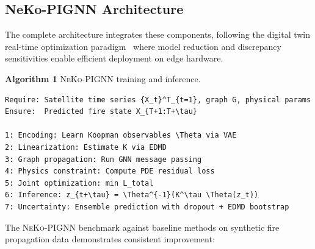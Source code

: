 \documentclass[5p,twocolumn]{elsarticle}
\newcommand{\abbrev}[1]{{\small\textsc{#1}}}
\begin{document}
\subsection{NeKo-PIGNN Architecture}

The complete architecture integrates these components, following the digital twin real-time optimization paradigm~\cite{hart2025} where model reduction and discrepancy sensitivities enable efficient deployment on edge hardware.

\medskip
\noindent\textbf{Algorithm 1} \abbrev{NeKo-PIGNN} training and inference.
\label{alg:neko}
\small
\begin{verbatim}
Require: Satellite time series {X_t}^T_{t=1}, graph G, physical params
Ensure:  Predicted fire state X_{T+1:T+\tau}

1: Encoding: Learn Koopman observables \Theta via VAE
2: Linearization: Estimate K via EDMD
3: Graph propagation: Run GNN message passing
4: Physics constraint: Compute PDE residual loss
5: Joint optimization: min L_total
6: Inference: z_{t+\tau} = \Theta^{-1}(K^\tau \Theta(z_t))
7: Uncertainty: Ensemble prediction with dropout + EDMD bootstrap
\end{verbatim}
\medskip

The \abbrev{NeKo-PIGNN} benchmark against baseline methods on synthetic fire propagation data demonstrates consistent improvement:

\begin{table}[htbp]
\centering
\caption{Benchmark comparison---synthetic fire propagation data.}
\label{tab:neko_benchmark}
\small
{}
\end{table}
\end{document}
